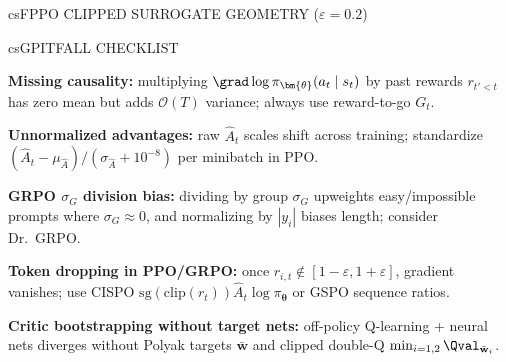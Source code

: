 \documentclass[../../../../master.tex]{subfiles}
\begin{document}
\begin{cscolumns}
\begin{cscard}{csF}{PPO CLIPPED SURROGATE GEOMETRY ($\varepsilon=0.2$)}
  \centering
\end{cscard}
\columnbreak

\begin{cscard}{csG}{PITFALL CHECKLIST}
  \begin{csbul}
    \item \textbf{Missing causality:} multiplying $\grad\log\pi_{\bm{\theta}}(a_t\mid s_t)$ by past rewards $r_{t'<t}$ has zero mean but adds $\mathcal{O}(T)$ variance; always use reward-to-go $G_t$.
    \item \textbf{Unnormalized advantages:} raw $\hat{A}_t$ scales shift across training; standardize $(\hat{A}_t-\mu_{\hat{A}})/(\sigma_{\hat{A}}+10^{-8})$ per minibatch in PPO.
    \item \textbf{GRPO $\sigma_G$ division bias:} dividing by group $\sigma_G$ upweights easy/impossible prompts where $\sigma_G\approx 0$, and normalizing by $|y_i|$ biases length; consider Dr.\ GRPO.
    \item \textbf{Token dropping in PPO/GRPO:} once $r_{i,t}\notin[1-\varepsilon,1+\varepsilon]$, gradient vanishes; use CISPO $\mathrm{sg}(\mathrm{clip}(r_t))\hat{A}_t\log\pi_{\bm{\theta}}$ or GSPO sequence ratios.
    \item \textbf{Critic bootstrapping without target nets:} off-policy Q-learning + neural nets diverges without Polyak targets $\bar{\mathbf{w}}$ and clipped double-Q $\min_{i=1,2}\Qval_{\bar{\mathbf{w}}_i}$.
  \end{csbul}
\end{cscard}


\end{cscolumns}
\end{document}

